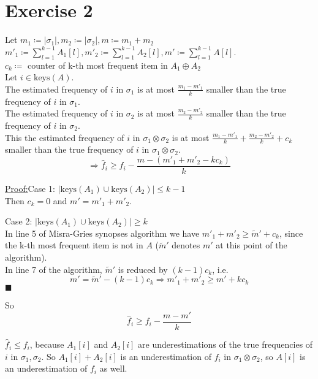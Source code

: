 \documentclass{article}
\newenvironment{claim}[1]{\par\noindent\underline{Claim:}\space#1}{}
\newenvironment{claimproof}[1]{\par\noindent\underline{Proof:}\space#1}{\hfill $\blacksquare$}
\begin{document}
\newpage
\section*{Exercise 2}
Let $m_1 \coloneqq \lvert \sigma_1 \rvert ,m_2 \coloneqq \lvert \sigma_2 \rvert, m \coloneqq m_1 + m_2$\\
$m'_1 \coloneqq \sum_{l=1}^{k-1}A_1[l], m'_2 \coloneqq \sum_{l=1}^{k-1}A_2[l], m' \coloneqq \sum_{l=1}^{k-1}A[l]$.\\
$c_k \coloneqq $ counter of k-th most frequent item in $A_1 \oplus A_2$\\
Let $i \in \text{keys}(A).$\\
The estimated frequency of $i$ in $\sigma_1$ is at most $\frac{m_1 - m'_1}{k}$ smaller than the true frequency of $i$ in $\sigma_1$.\\
The estimated frequency of $i$ in $\sigma_2$ is at most $\frac{m_2 - m'_2}{k}$ smaller than the true frequency of $i$ in $\sigma_2$.\\
This the estimated frequency of $i$ in $\sigma_1 \otimes \sigma_2$ is at most $\frac{m_1 - m'_1}{k} + \frac{m_2 - m'_2}{k} + c_k$ smaller than the true frequency of $i$ in $\sigma_1 \otimes \sigma_2$.\\
\[
\Rightarrow \hat{f}_i \geq f_i - \frac{m-(m'_1 + m'_2 -kc_k)}{k}
\]
\begin{claimproof}
Case 1: $\lvert \text{keys}(A_1) \cup \text{keys}(A_2) \rvert \leq k-1$\\
Then $c_k = 0$ and $m' = m'_1 + m'_2$.

Case 2: $\lvert \text{keys}(A_1) \cup \text{keys}(A_2) \rvert \geq k$\\
In line 5 of Misra-Gries synopses algorithm we have $m'_1 + m'_2 \geq \widetilde{m}' + c_k$,
since the k-th most frequent item is not in $A$ ($\widetilde{m}'$ denotes $m'$ at this point of the algorithm).\\
In line 7 of the algorithm, $\widetilde{m}'$ is reduced by $(k-1)c_k$, i.e.
\[
m' = \widetilde{m}' - (k-1)c_k \Rightarrow m'_1 + m'_2 \geq m' + kc_k
\]
\end{claimproof}

So
\[
\hat{f}_i \geq f_i - \frac{m-m'}{k}
\]

$\hat{f}_i \leq f_i$, because $A_1[i]$ and $A_2[i]$ are underestimations of the true frequencies of $i$ in $\sigma_1, \sigma_2$.
So $A_1[i] + A_2[i]$ is an underestimation of $f_i$ in $\sigma_1 \otimes \sigma_2$, so $A[i]$ is an underestimation of $f_i$ as well.
\end{document}

